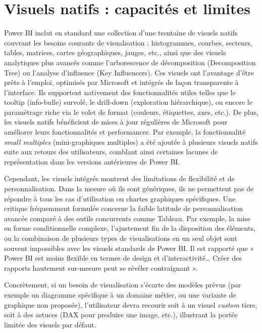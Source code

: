 \section{Visuels natifs : capacités et limites}

Power BI inclut en standard une collection d’une trentaine de visuels natifs couvrant les besoins courants de visualisation : histogrammes, courbes, secteurs, tables, matrices, cartes géographiques, jauges, etc., ainsi que des visuels analytiques plus avancés comme l’arborescence de décomposition (Decomposition Tree) ou l’analyse d’influence (Key Influencers). Ces visuels ont l’avantage d’être prêts à l’emploi, optimisés par Microsoft et intégrés de façon transparente à l’interface. Ils supportent nativement des fonctionnalités utiles telles que le tooltip (info-bulle) survolé, le drill-down (exploration hiérarchique), ou encore le paramétrage riche via le volet de format (couleurs, étiquettes, axes, etc.). De plus, les visuels natifs bénéficient de mises à jour régulières de Microsoft pour améliorer leurs fonctionnalités et performances. Par exemple, la fonctionnalité \textit{small multiples} (mini-graphiques multiples) a été ajoutée à plusieurs visuels natifs suite aux retours des utilisateurs, comblant ainsi certaines lacunes de représentation dans les versions antérieures de Power BI\parencite{MicrosoftReleaseNotes2024}.

Cependant, les visuels intégrés montrent des limitations de flexibilité et de personnalisation. Dans la mesure où ils sont génériques, ils ne permettent pas de répondre à tous les cas d’utilisation ou chartes graphiques spécifiques. Une critique fréquemment formulée concerne la faible latitude de personnalisation avancée comparé à des outils concurrents comme Tableau\parencite{FyndAcademyPBIvsTableau2024}. Par exemple, la mise en forme conditionnelle complexe, l’ajustement fin de la disposition des éléments, ou la combinaison de plusieurs types de visualisations en un seul objet sont souvent impossibles avec les visuels standards de Power BI. Il est rapporté que « Power BI est moins flexible en termes de design et d’interactivité… Créer des rapports hautement sur-mesure peut se révéler contraignant »\parencite{FyndAcademyPBIvsTableau2024}.

Concrètement, si un besoin de visualisation s’écarte des modèles prévus (par exemple un diagramme spécifique à un domaine métier, ou une variante de graphique non proposée), l’utilisateur devra recourir soit à un visuel \textit{custom} tiers, soit à des astuces (DAX pour produire une image, etc.), illustrant la portée limitée des visuels par défaut\parencite{FyndAcademyPBIvsTableau2024}.

